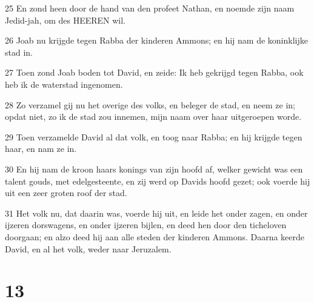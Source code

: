 \par 25 En zond heen door de hand van den profeet Nathan, en noemde zijn naam Jedid-jah, om des HEEREN wil.
\par 26 Joab nu krijgde tegen Rabba der kinderen Ammons; en hij nam de koninklijke stad in.
\par 27 Toen zond Joab boden tot David, en zeide: Ik heb gekrijgd tegen Rabba, ook heb ik de waterstad ingenomen.
\par 28 Zo verzamel gij nu het overige des volks, en beleger de stad, en neem ze in; opdat niet, zo ik de stad zou innemen, mijn naam over haar uitgeroepen worde.
\par 29 Toen verzamelde David al dat volk, en toog naar Rabba; en hij krijgde tegen haar, en nam ze in.
\par 30 En hij nam de kroon haars konings van zijn hoofd af, welker gewicht was een talent gouds, met edelgesteente, en zij werd op Davids hoofd gezet; ook voerde hij uit een zeer groten roof der stad.
\par 31 Het volk nu, dat daarin was, voerde hij uit, en leide het onder zagen, en onder ijzeren dorswagens, en onder ijzeren bijlen, en deed hen door den ticheloven doorgaan; en alzo deed hij aan alle steden der kinderen Ammons. Daarna keerde David, en al het volk, weder naar Jeruzalem.

\chapter{13}

